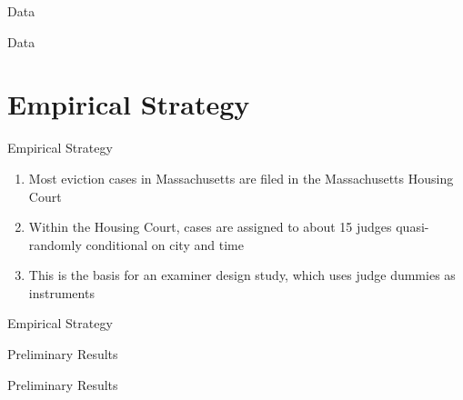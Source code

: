 \documentclass [xcolor=svgnames, t] {beamer}
\begin{document}
\begin{frame}{Data}
\begin{table}[H]
    \centering
    \tiny
    
    \label{tab:my_label}
\end{table}
\end{frame}


\begin{frame}{Data}
\begin{table}[H]
    \centering
    \tiny
    
    \label{tab:my_label}
\end{table}
\end{frame}




\section{Empirical Strategy}
\begin{frame}{Empirical Strategy}
    \begin{enumerate}
        \item Most eviction cases in Massachusetts are filed in the Massachusetts Housing Court
        \item Within the Housing Court, cases are assigned to about 15 judges quasi-randomly conditional on city and time
        \item This is the basis for an examiner design study, which uses judge dummies as instruments
    \end{enumerate}
\end{frame}

\begin{frame}{Empirical Strategy}
\begin{table}[H]
    \centering
    \tiny
    
    \label{tab:my_label}
\end{table}    
\end{frame}

\begin{frame}{Preliminary Results}
    \begin{table}[H]
        \centering
        \tiny
        
        \label{tab:my_label}
    \end{table}
\end{frame}
\begin{frame}{Preliminary Results}
    \begin{table}[H]
        \centering
        \tiny
        
        \label{tab:my_label}
    \end{table}
\end{frame}
\end{document}

